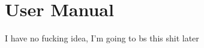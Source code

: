 
\part{User Manual} %

\label{Part10} %

%
%
%
I have no fucking idea, I'm going to bs this shit later